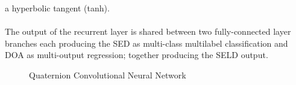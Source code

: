 \documentclass{article}
\begin{document}
    a hyperbolic tangent (tanh).
    \\ \\ The output of the recurrent layer is shared between two fully-connected layer branches each producing the SED as 
    multi-class multilabel classification and DOA as multi-output regression; together producing the SELD output.
    \begin{figure}[htb!]
        \centering
        \caption{Quaternion Convolutional Neural Network}
        \label{fig:dqnn}
    \end{figure}
\end{document}
